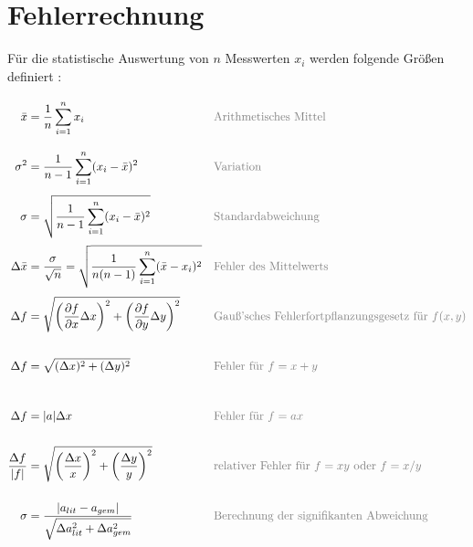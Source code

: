 \onecolumn
\section{Fehlerrechnung}
Für die statistische Auswertung von $n$ Messwerten $x_i$ werden folgende Größen definiert \cite{errorSkript25}:
\begin{align}
    \bar{x} &= \frac{1}{n} \sum_{i=1}^{n} x_i \vphantom{\sqrt{\sum_i^n}^2} && \text{\textcolor{gray}{Arithmetisches Mittel}}\\
    \sigma^2 &= \frac{1}{n-1} \sum_{i=1}^{n} (x_i - \bar{x})^2 \vphantom{\sqrt{\sum_i^n}^2} && \text{\textcolor{gray}{Variation}}\\
    \sigma &= \sqrt{\frac{1}{n-1} \sum_{i=1}^{n} (x_i - \bar{x})^2} \vphantom{\sqrt{\sum_i^n}^2} && \text{\textcolor{gray}{Standardabweichung}}\\
    \Delta \bar{x} &= \frac{\sigma}{\sqrt{n}} = \sqrt{\frac{1}{n(n-1)} \sum_{i=1}^n(\bar x - x_i)^2} \vphantom{\sqrt{\sum_i^n}^2} && \text{\textcolor{gray}{Fehler des Mittelwerts}}\\
    \Delta f &= \sqrt{\left(\frac{\partial f}{\partial x} \Delta x\right)^2 + \left(\frac{\partial f}{\partial y} \Delta y\right)^2} \vphantom{\sqrt{\sum_i^n}^2} && \text{\textcolor{gray}{Gauß’sches Fehlerfortpflanzungsgesetz für $f(x,y)$}}\\
    \Delta f &= \sqrt{(\Delta x)^2 + (\Delta y)^2} \vphantom{\sqrt{\sum_i^n}^2} && \text{\textcolor{gray}{Fehler für $f = x + y$}}\\
    \Delta f &= |a| \Delta x \vphantom{\sqrt{\sum_i^n}^2} && \text{\textcolor{gray}{Fehler für $f = ax$}}\\
    \frac{\Delta f}{|f|} &= \sqrt{\left(\frac{\Delta x}{x}\right)^2 + \left(\frac{\Delta y}{y}\right)^2} \vphantom{\sqrt{\sum_i^n}^2} && \text{\textcolor{gray}{relativer Fehler für $f = xy$ oder $f = x/y$}}\\
    \sigma &= \frac{|a_{lit} - a_{gem}|}{\sqrt{\Delta a_{lit}^2 + \Delta a_{gem}^2}} \vphantom{\sqrt{\sum_i^n}^2} && \text{\textcolor{gray}{Berechnung der signifikanten Abweichung}}
\end{align}

\twocolumn